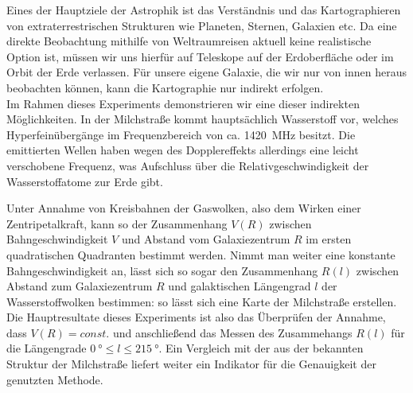 \documentclass[../main.tex]{subfiles}
\begin{document}
Eines der Hauptziele der Astrophik ist das Verständnis und das Kartographieren von extraterrestrischen Strukturen wie Planeten, Sternen, Galaxien etc. Da eine direkte Beobachtung mithilfe von Weltraumreisen aktuell keine realistische Option ist, müssen wir uns hierfür auf Teleskope auf der Erdoberfläche oder im Orbit der Erde verlassen. Für unsere eigene Galaxie, die wir nur von innen heraus beobachten können, kann die Kartographie nur indirekt erfolgen.\\

Im Rahmen dieses Experiments demonstrieren wir eine dieser indirekten Möglichkeiten. In der Milchstraße kommt hauptsächlich Wasserstoff vor, welches Hyperfeinübergänge im Frequenzbereich von ca. \SI{1420}{\mega\hertz} besitzt. Die emittierten Wellen haben wegen des Dopplereffekts allerdings eine leicht verschobene Frequenz, was Aufschluss über die Relativgeschwindigkeit der Wasserstoffatome zur Erde gibt.

Unter Annahme von Kreisbahnen der Gaswolken, also dem Wirken einer Zentripetalkraft, kann so der Zusammenhang $V(R)$ zwischen Bahngeschwindigkeit $V$ und Abstand vom Galaxiezentrum $R$ im ersten quadratischen Quadranten bestimmt werden. Nimmt man weiter eine konstante Bahngeschwindigkeit an, lässt sich so sogar den Zusammenhang $R(l)$ zwischen Abstand zum Galaxiezentrum $R$ und galaktischen Längengrad $l$ der Wasserstoffwolken bestimmen: so lässt sich eine Karte der Milchstraße erstellen.\\

\noindent Die Hauptresultate dieses Experiments ist also das Überprüfen der Annahme, dass $V(R)=const.$ und anschließend das Messen des Zusammehangs $R(l)$ für die Längengrade $\SI{0}{\degree}\le l\le \SI{215}{\degree}$. Ein Vergleich mit der aus der bekannten Struktur der Milchstraße liefert weiter ein Indikator für die Genauigkeit der genutzten Methode.
\end{document}
